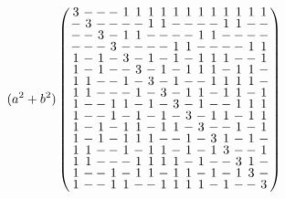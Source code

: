 \documentclass{beamer}
\begin{document}
\begin{frame}

  \[
      (a^2+b^2)
      \arraycolsep=1.0pt\def\arraystretch{0.75}
      \left(
      \begin{array}{cccccccccccccccc}
        3&-&-&-&1&1&1&1&1&1&1&1&1&1&1&1\\
        -&3&-&-&-&-&1&1&-&-&-&-&1&1&-&-\\
        -&-&3&-&1&1&-&-&-&-&1&1&-&-&-&-\\
        -&-&-&3&-&-&-&-&1&1&-&-&-&-&1&1\\
        1&-&1&-&3&-&1&-&1&-&1&1&1&-&-&1\\
        1&-&1&-&-&3&-&1&-&1&1&1&-&1&1&-\\
        1&1&-&-&1&-&3&-&1&-&-&1&1&1&1&-\\
        1&1&-&-&-&1&-&3&-&1&1&-&1&1&-&1\\
        1&-&-&1&1&-&1&-&3&-&1&-&-&1&1&1\\
        1&-&-&1&-&1&-&1&-&3&-&1&1&-&1&1\\
        1&-&1&-&1&1&-&1&1&-&3&-&-&1&-&1\\
        1&-&1&-&1&1&1&-&-&1&-&3&1&-&1&-\\
        1&1&-&-&1&-&1&1&-&1&-&1&3&-&-&1\\
        1&1&-&-&-&1&1&1&1&-&1&-&-&3&1&-\\
        1&-&-&1&-&1&1&-&1&1&-&1&-&1&3&-\\
        1&-&-&1&1&-&-&1&1&1&1&-&1&-&-&3\\
      \end{array}
    \right)
  \]
  
\end{frame}
\end{document}

